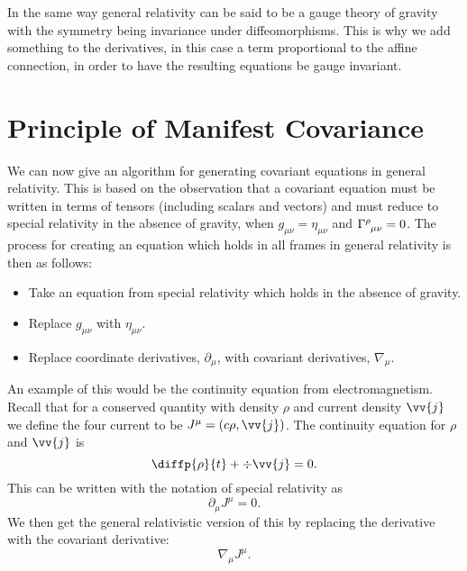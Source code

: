 \documentclass[fleqn]{NotesClass}
\newcommand*{\christoffel}[3]{\tensor{\Gamma}{^{#1}_{{#2}{#3}}}}
\newcommand*{\covariantDerivative}[1]{\nabla_{\!#1}}
\begin{document}
    In the same way general relativity can be said to be a gauge theory of gravity with the symmetry being invariance under diffeomorphisms.
    This is why we add something to the derivatives, in this case a term proportional to the affine connection, in order to have the resulting equations be gauge invariant.
    
    \section{Principle of Manifest Covariance}
    We can now give an algorithm for generating covariant equations in general relativity.
    This is based on the observation that a covariant equation must be written in terms of tensors (including scalars and vectors) and must reduce to special relativity in the absence of gravity, when \(g_{\mu\nu} = \eta_{\mu\nu}\) and \(\christoffel{\rho}{\mu}{\nu} = 0\).
    The process for creating an equation which holds in all frames in general relativity is then as follows:
    \begin{itemize}
        \item Take an equation from special relativity which holds in the absence of gravity.
        \item Replace \(g_{\mu\nu}\) with \(\eta_{\mu\nu}\).
        \item Replace coordinate derivatives, \(\partial_\mu\), with covariant derivatives, \(\covariantDerivative{\mu}\).
    \end{itemize}
    
    An example of this would be the continuity equation from electromagnetism.
    Recall that for a conserved quantity with density \(\rho\) and current density \(\vv{j}\) we define the four current to be \(J^\mu = (c\rho, \vv{j})\).
    The continuity equation for \(\rho\) and \(\vv{j}\) is
    \begin{equation}
        \diffp{\rho}{t} + \div\vv{j} = 0.
    \end{equation}
    This can be written with the notation of special relativity as
    \begin{equation}
        \partial_\mu J^\mu = 0.
    \end{equation}
    We then get the general relativistic version of this by replacing the derivative with the covariant derivative:
    \begin{equation}
        \covariantDerivative{\mu} J^\mu.
    \end{equation}
    
\end{document}
